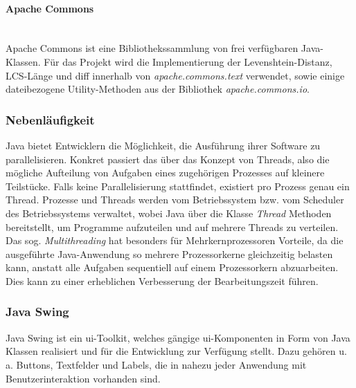 \paragraph{Apache Commons}\mbox{}\\
Apache Commons ist eine Bibliothekssammlung von frei verfügbaren Java-Klassen. Für das Projekt wird die Implementierung der Levenshtein-Distanz, LCS-Länge und \acrshort{diff} innerhalb von \textit{apache.commons.text} verwendet, sowie einige dateibezogene Utility-Methoden aus der Bibliothek \textit{apache.commons.io}.

\subsubsection{Nebenläufigkeit}

Java bietet Entwicklern die Möglichkeit, die Ausführung ihrer Software zu parallelisieren. Konkret passiert das über das Konzept von Threads, also die mögliche Aufteilung von Aufgaben eines zugehörigen Prozesses auf kleinere Teilstücke. Falls keine Parallelisierung stattfindet, existiert pro Prozess genau ein Thread. Prozesse und Threads werden vom Betriebssystem bzw. vom Scheduler des Betriebssystems verwaltet, wobei Java über die Klasse \textit{Thread} Methoden bereitstellt, um Programme aufzuteilen und auf mehrere Threads zu verteilen. Das sog. \textit{Multithreading} hat besonders für Mehrkernprozessoren Vorteile, da die ausgeführte Java-Anwendung so mehrere Prozessorkerne gleichzeitig belasten kann, anstatt alle Aufgaben sequentiell auf einem Prozessorkern abzuarbeiten. Dies kann zu einer erheblichen Verbesserung der Bearbeitungszeit führen.

\subsubsection{Java Swing}

Java Swing ist ein \acrshort{ui}-Toolkit, welches gängige \acrshort{ui}-Komponenten in Form von Java Klassen realisiert und für die Entwicklung zur Verfügung stellt. Dazu gehören u.\,a. Buttons, Textfelder und Labels, die in nahezu jeder Anwendung mit Benutzerinteraktion vorhanden sind. 

